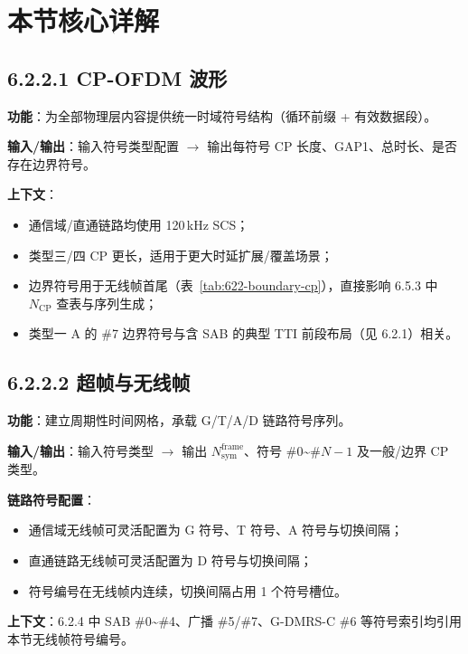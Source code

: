\documentclass[11pt,a4paper]{ctexart}
\begin{document}
\section{本节核心详解}

\subsection{6.2.2.1 CP-OFDM 波形}

\textbf{功能}：为全部物理层内容提供统一时域符号结构（循环前缀 + 有效数据段）。

\textbf{输入/输出}：输入符号类型配置 $\rightarrow$ 输出每符号 CP 长度、GAP1、总时长、是否存在边界符号。

\textbf{上下文}：
\begin{itemize}[nosep]
  \item 通信域/直通链路均使用 120\,kHz SCS；
  \item 类型三/四 CP 更长，适用于更大时延扩展/覆盖场景；
  \item 边界符号用于无线帧首尾（表~\ref{tab:622-boundary-cp}），直接影响 6.5.3 中 $N_{\mathrm{CP}}$ 查表与序列生成；
  \item 类型一 A 的 \#7 边界符号与含 SAB 的典型 TTI 前段布局（见 6.2.1）相关。
\end{itemize}

\subsection{6.2.2.2 超帧与无线帧}

\textbf{功能}：建立周期性时间网格，承载 G/T/A/D 链路符号序列。

\textbf{输入/输出}：输入符号类型 $\rightarrow$ 输出 $N_{\mathrm{sym}}^{\mathrm{frame}}$、符号 \#0\textasciitilde\#$N{-}1$ 及一般/边界 CP 类型。

\textbf{链路符号配置}：
\begin{itemize}[nosep]
  \item 通信域无线帧可灵活配置为 G 符号、T 符号、A 符号与切换间隔；
  \item 直通链路无线帧可灵活配置为 D 符号与切换间隔；
  \item 符号编号在无线帧内连续，切换间隔占用 1 个符号槽位。
\end{itemize}

\textbf{上下文}：6.2.4 中 SAB \#0\textasciitilde\#4、广播 \#5/\#7、G-DMRS-C \#6 等符号索引均引用本节无线帧符号编号。
\end{document}
